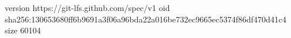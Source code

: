 version https://git-lfs.github.com/spec/v1
oid sha256:130653680ff6b9691a3f06a96bda22a016be732ec9665ec5374f86df470d41c4
size 60104

